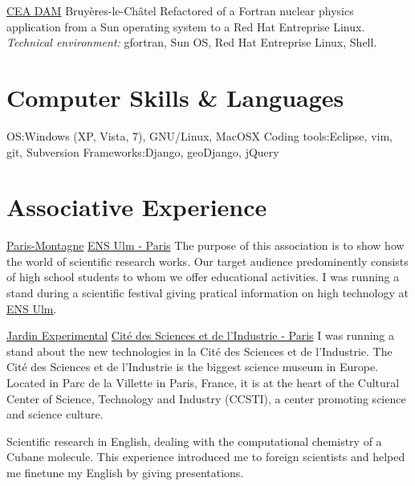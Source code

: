 \documentclass[letterpaper,final]{moderncv}
\begin{document}
{\href{http://www-dam.cea.fr/}{CEA DAM}}
{Bruyères-le-Châtel}{}{
  Refactored of a Fortran nuclear physics application from a Sun operating system to a Red Hat Entreprise Linux.
  \newline
\textit{Technical environment:} gfortran, Sun OS, Red Hat Entreprise Linux, Shell.}

\section{Computer Skills \& Languages}

{OS:}{Windows (XP, Vista, 7), GNU/Linux, MacOSX}
{Coding tools:}{Eclipse, vim, git, Subversion}
{Frameworks:}{Django, geoDjango, jQuery}


\section{Associative Experience}

{\href{http://www.paris-montagne.org/}{Paris-Montagne}}
{\href{http://www.ens.fr/}{ENS Ulm - Paris}}{}
{The purpose of this association is to show how the world
  of scientific research works. Our target audience predominently
  consists of high school students to whom we offer educational activities.
  I was running a stand during a scientific festival
giving pratical information on high technology at \href{http://www.ens.fr/}{ENS Ulm}.}

{\href{http://www.jardin-experimental.com/}{Jardin Experimental}}
{\href{http://www.cite-sciences.fr/fr/cite-des-sciences/}{Cité des Sciences et de l’Industrie - Paris}}{}
{I was running a stand about the new technologies in la Cité des Sciences et
  de l’Industrie. The Cité des Sciences et de l’Industrie is the biggest science
  museum in Europe. Located in Parc de la Villette in Paris, France, it is at
  the heart of the Cultural Center of Science, Technology and Industry (CCSTI), a
center promoting science and science culture.}

{Scientific research in English, dealing with the computational chemistry
of a Cubane molecule. This experience introduced me to foreign
scientists and helped me finetune my English by giving presentations.}
\end{document}
